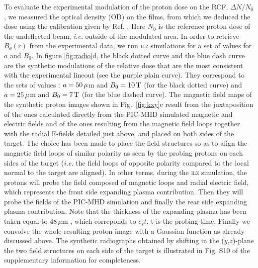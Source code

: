 \documentclass[aps,twocolumn,showpacs,superscriptaddress]{revtex4}
\begin{document}
To evaluate the experimental modulation of the proton dose on the RCF, $\Delta N/N_0$, we measured the optical density (OD) on the films, from which we deduced the dose using the calibration given by Ref. \cite{RSI_Chen_2016}. Here $N_0$ is the reference proton dose of the undeflected beam, \emph{i.e.} outside of the modulated area. In order to retrieve  $B_\theta(r)$ from the experimental data, we run \textsc{ilz} simulations for a set of values for $a$ and $B_0$. In figure \ref{fig:radio}d, the black dotted curve and the blue dash curve are the synthetic modulations of the relative dose that are the most consistent with the experimental lineout (see the purple plain curve). They correspond to the  sets of values : $a=50\,\rm \mu$m and $B_0=10\,\rm T$ (for the black dotted curve) and $a=25\,\rm \mu$m and $B_0=7\,\rm T$ (for the blue dashed curve).
%
The magnetic field maps of the synthetic proton images shown in Fig.~\ref{fig:kxy}c result from the juxtaposition of the ones calculated directly from the PIC-MHD simulated magnetic and electric fields and of the ones resulting from the magnetic field loops together with the radial E-fields detailed just above, and placed on both sides of the target.
The choice has been made to place the field structures so as to align the magnetic field loops of similar polarity as seen by the probing protons  on each sides of the target (\emph{i.e.} the field loops of opposite polarity compared to the local normal to the target are aligned).
%
In other terms, during the \textsc{ilz} simulation, the protons will probe the field composed of magnetic loops and radial electric field, which represents the front side expanding plasma contribution. Then they will probe  the fields of the PIC-MHD simulation and finally the rear side expanding plasma contribution.  Note that the thickness of the expanding plasma has been taken equal to $ 48 \, \mu$m , which correponds to $c_s t $, t is the probing time. Finally we convolve the whole resulting proton image with a Gaussian function as already discussed above. 
The synthetic radiographs obtained by shifting in the ($y$,$z$)-plane the two field structures on each side of the target is illustrated in Fig. S10 of the supplementary information for completeness. 
\end{document}

